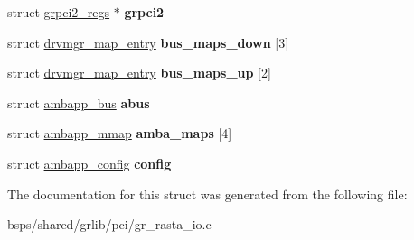 \begin{DoxyCompactItemize}
\item 
\mbox{\label{structgr__rasta__io__priv_aef5a93d2317c19cdb7c9facd7e8cfa4a}} 
struct \mbox{\hyperlink{structgrpci2__regs}{grpci2\+\_\+regs}} $\ast$ {\bfseries grpci2}
\item 
\mbox{\label{structgr__rasta__io__priv_aab9c2bba3957e4cf486878253a78b1dc}} 
struct \mbox{\hyperlink{structdrvmgr__map__entry}{drvmgr\+\_\+map\+\_\+entry}} {\bfseries bus\+\_\+maps\+\_\+down} \mbox{[}3\mbox{]}
\item 
\mbox{\label{structgr__rasta__io__priv_afb1fef2d8555063109f2ba18e347eea9}} 
struct \mbox{\hyperlink{structdrvmgr__map__entry}{drvmgr\+\_\+map\+\_\+entry}} {\bfseries bus\+\_\+maps\+\_\+up} \mbox{[}2\mbox{]}
\item 
\mbox{\label{structgr__rasta__io__priv_ac6a3d165c5455d69b694314a81f111bd}} 
struct \mbox{\hyperlink{structambapp__bus}{ambapp\+\_\+bus}} {\bfseries abus}
\item 
\mbox{\label{structgr__rasta__io__priv_a491604c0cbf82dce4bda0ff63a9e5b04}} 
struct \mbox{\hyperlink{structambapp__mmap}{ambapp\+\_\+mmap}} {\bfseries amba\+\_\+maps} \mbox{[}4\mbox{]}
\item 
\mbox{\label{structgr__rasta__io__priv_a1fed96410534a52951cd760323b6311d}} 
struct \mbox{\hyperlink{structambapp__config}{ambapp\+\_\+config}} {\bfseries config}
\end{DoxyCompactItemize}


The documentation for this struct was generated from the following file\+:\begin{DoxyCompactItemize}
\item 
bsps/shared/grlib/pci/gr\+\_\+rasta\+\_\+io.\+c\end{DoxyCompactItemize}
